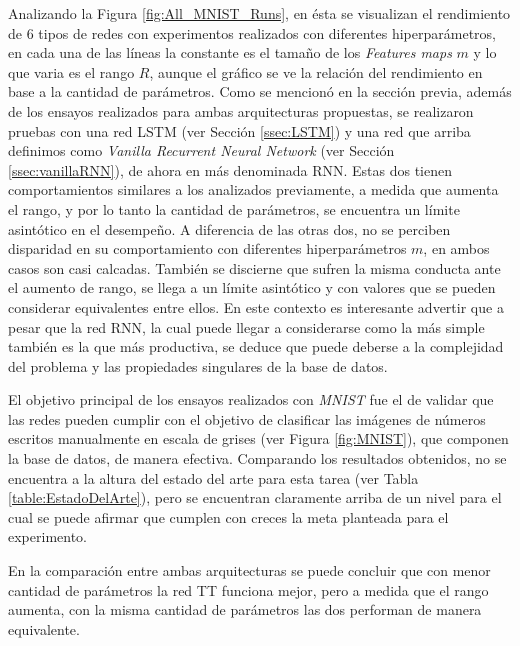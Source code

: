 \documentclass[spanish]{article}
\theoremstyle{definition}
\theoremstyle{remark}
\numberwithin{equation}{section}
\numberwithin{equation}{section} %
\begin{document}
\par
Analizando la Figura \ref{fig:All_MNIST_Runs}, en ésta se visualizan el rendimiento de 6 tipos de redes con experimentos realizados con diferentes hiperparámetros, en cada una de las líneas la constante es el tamaño de los \textit{Features maps} $m$ y lo que varia es el rango $R$, aunque el gráfico se ve la relación del rendimiento en base a la cantidad de parámetros. Como se mencionó en la sección previa, además de los ensayos realizados  para ambas arquitecturas propuestas, se realizaron pruebas con una red LSTM (ver Sección \ref{ssec:LSTM}) y una red que arriba definimos como \textit{Vanilla Recurrent Neural Network} (ver Sección \ref{ssec:vanillaRNN}), de ahora en más denominada RNN. Estas dos tienen comportamientos similares a los analizados previamente, a medida que aumenta el rango, y por lo tanto la cantidad de parámetros, se encuentra un límite asintótico en el desempeño. A diferencia de las otras dos, no se perciben disparidad en su comportamiento con diferentes hiperparámetros $m$,  en ambos casos son casi calcadas. También se discierne que sufren la misma conducta ante el aumento de rango, se llega a un límite asintótico y con valores que se pueden  considerar equivalentes entre ellos. En este contexto es interesante advertir que a pesar que la red RNN, la cual puede llegar a considerarse como la más simple también es la que más productiva, se deduce que puede deberse a la complejidad del problema y las propiedades singulares de la base de datos. 
\par
El objetivo principal de los ensayos realizados con \textit{MNIST} fue el de validar que las redes pueden cumplir con el objetivo de clasificar las imágenes de números escritos manualmente en escala de grises (ver Figura \ref{fig:MNIST}), que componen la base de datos, de manera efectiva. Comparando los resultados obtenidos, no se encuentra a la altura del estado del arte para esta tarea (ver Tabla \ref{table:EstadoDelArte}), pero se encuentran claramente arriba de un nivel para el cual se puede afirmar que cumplen con creces la meta planteada para el experimento.
\par
En la comparación entre ambas arquitecturas se puede concluir que con menor cantidad de parámetros la red TT funciona mejor, pero a medida que el rango aumenta, con la misma cantidad de parámetros las dos performan de manera equivalente.
\par
\end{document}
